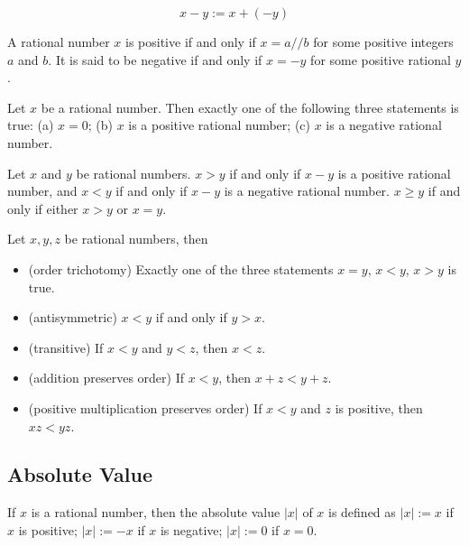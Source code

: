 \documentclass{blog}
\begin{document}
\begin{definition}[substraction]
  \begin{equation}
    x - y := x + (-y)
  \end{equation}
\end{definition}

\begin{definition}
  A rational number $x$ is positive if and only if $x = a // b$ for some positive integers $a$ and $b$.
  It is said to be negative if and only if $x = -y$ for some positive rational $y$.
\end{definition}

\begin{lemma}
  Let $x$ be a rational number. Then exactly one of the following three statements is true:
  (a) $x = 0$;
  (b) $x$ is a positive rational number;
  (c) $x$ is a negative rational number.
\end{lemma}

\begin{definition}[order]
  Let $x$ and $y$ be rational numbers.
  $x > y$ if and only if $x - y$ is a positive rational number, and
  $x < y$ if and only if $x - y$ is a negative rational number.
  $x \geq y$ if and only if either $x > y$ or $x = y$.
\end{definition}

\begin{proposition}
  Let $x, y, z$ be rational numbers, then
  \begin{itemize}
  \item (order trichotomy)
    Exactly one of the three statements $x = y$, $x < y$, $x > y$ is true.
  \item (antisymmetric)
    $x < y$ if and only if $y > x$.
  \item (transitive)
    If $x < y$ and $y < z$, then $x < z$.
  \item (addition preserves order)
    If $x < y$, then $x + z < y + z$.
  \item (positive multiplication preserves order)
    If $x < y$ and $z$ is positive, then $x z < y z$.
  \end{itemize}
\end{proposition}

\subsection{Absolute Value}
\begin{definition}
  If $x$ is a rational number, then the absolute value $|x|$ of $x$ is defined as
  $|x| := x$ if $x$ is positive;
  $|x| := -x$ if $x$ is negative;
  $|x| := 0$ if $x = 0$.
\end{definition}
\end{document}
